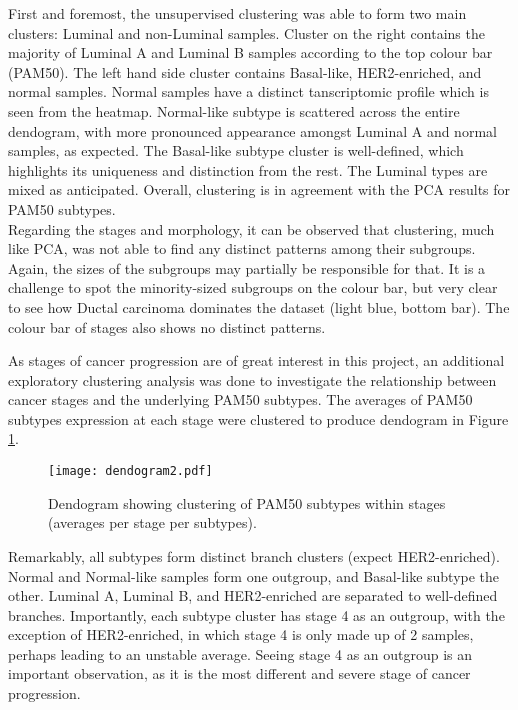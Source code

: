     First and foremost, the unsupervised clustering was able to form two main clusters: Luminal and non-Luminal samples. Cluster on the right contains the majority of Luminal A and Luminal B samples according to the top colour bar (PAM50). The left hand side cluster contains Basal-like, HER2-enriched, and normal samples. Normal samples have a distinct tanscriptomic profile which is seen from the heatmap. Normal-like subtype is scattered across the entire dendogram, with more pronounced appearance amongst Luminal A and normal samples, as expected. The Basal-like subtype cluster is well-defined, which highlights its uniqueness and distinction from the rest. The Luminal types are mixed as anticipated. Overall, clustering is in agreement with the PCA results for PAM50 subtypes. \\    
    Regarding the stages and morphology, it can be observed that clustering, much like PCA, was not able to find any distinct patterns among their subgroups. Again, the sizes of the subgroups may partially be responsible for that. It is a challenge to spot the minority-sized subgroups on the colour bar, but very clear to see how Ductal carcinoma dominates the dataset (light blue, bottom bar). The colour bar of stages also shows no distinct patterns. \\ 
    \newline
    
    
    As stages of cancer progression are of great interest in this project, an additional exploratory clustering analysis was done to investigate the relationship between cancer stages and the underlying PAM50 subtypes. The averages of PAM50 subtypes expression at each stage were clustered to produce dendogram in Figure \ref{fig:dendogram}. 
    
            \begin{figure}[!h]
            \centering
            \texttt{[image: dendogram2.pdf]}
            \caption[Dendogram of PAM50 and stage subgroups clustering]{Dendogram showing clustering of PAM50 subtypes within stages (averages per stage per subtypes).}
            \label{fig:dendogram}
            \end{figure}
    
    Remarkably, all subtypes form distinct branch clusters (expect HER2-enriched). Normal and Normal-like samples form one outgroup, and Basal-like subtype the other. Luminal A, Luminal B, and HER2-enriched are separated to well-defined branches. Importantly, each subtype cluster has stage 4 as an outgroup, with the exception of HER2-enriched, in which stage 4 is only made up of 2 samples, perhaps leading to an unstable average. Seeing stage 4 as an outgroup is an important observation, as it is the most different and severe stage of cancer progression. 
    
